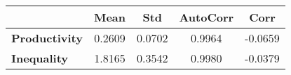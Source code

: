 \begin{tiny}\begin{tabular}{|l|c|c|c|c|}
\hline
&\textbf{Mean}&\textbf{Std}&\textbf{AutoCorr}&\textbf{Corr}\\\hline
\textbf{Productivity}&0.2609&0.0702&0.9964&-0.0659\\\hline
\textbf{Inequality}&1.8165&0.3542&0.9980&-0.0379\\\hline
\end{tabular}
\end{tiny}